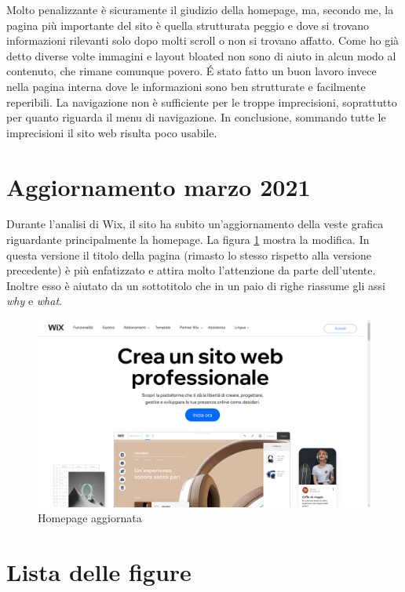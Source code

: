 \documentclass[11pt,a4paper]{article}
\newcommand*{\wix}{Wix}
\begin{document}
Molto penalizzante è sicuramente il giudizio della homepage, ma,
secondo me, la pagina più importante del sito è quella strutturata
peggio e dove si trovano informazioni rilevanti solo dopo molti scroll
o non si trovano affatto. Come ho già detto diverse volte immagini e
layout bloated non sono di aiuto in alcun modo al contenuto, che
rimane comunque povero. \'E stato fatto un buon lavoro invece nella
pagina interna dove le informazioni sono ben strutturate e facilmente
reperibili. La navigazione non è sufficiente per le troppe
imprecisioni, soprattutto per quanto riguarda il menu di
navigazione. In conclusione, sommando tutte le imprecisioni il sito
web risulta poco usabile.

\section{Aggiornamento marzo 2021}

Durante l'analisi di \wix{}, il sito ha subito un'aggiornamento della
veste grafica riguardante principalmente la homepage. La figura
\ref{fig:homepage-updated} mostra la modifica. In questa versione il
titolo della pagina (rimasto lo stesso rispetto alla versione
precedente) è più enfatizzato e attira molto l'attenzione da parte
dell'utente. Inoltre esso è aiutato da un sottotitolo che in un paio
di righe riassume gli assi \textit{why} e \textit{what}.

\begin{figure}[H]
  \centering
  \includegraphics[width=1\textwidth]{img/homepage-updated.png}
  \caption{Homepage aggiornata}
  \label{fig:homepage-updated}
\end{figure}

\section{Lista delle figure}
\end{document}
